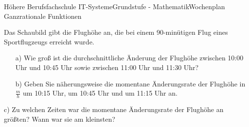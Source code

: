 \documentclass[oneside,openany,headings=optiontotoc,11pt,numbers=noenddot]{scrreprt}
\begin{document}
\begin{worksheet}{Höhere Berufsfachschule IT-Systeme}{Grundstufe - Mathematik}{Wochenplan Ganzrationale Funktionen}
\begin{framed}
\begin{figure}
			\end{figure}
			\par\noindent
			Das Schaubild gibt die Flughöhe an, die bei einem 90-minütigen Flug eines Sportflugzeugs erreicht wurde.
			\begin{itemize}
				\item[a)] Wie groß ist die durchschnittliche Änderung der Flughöhe zwischen 10:00 Uhr und 10:45 Uhr sowie zwischen 11:00 Uhr und 11:30 Uhr?
				\item[b)] Geben Sie näherungsweise die momentane Änderungsrate der Flughöhe in $\frac{m}{h}$ um 10:15 Uhr, um 10:45 Uhr und um 11:15 Uhr an.\\
			\end{itemize}
			c) Zu welchen Zeiten war die momentane Änderungsrate der Flughöhe an größten? Wann war sie am kleinsten?
			
		\end{framed}
	\end{worksheet}
\end{document}
